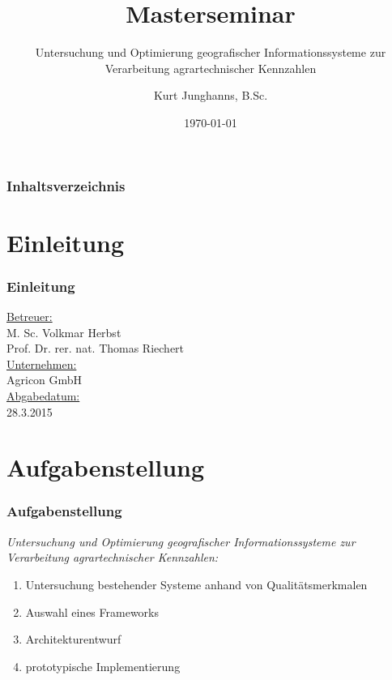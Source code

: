 \documentclass{beamer}
\begin{document}
\title{Masterseminar}
\subtitle{Untersuchung und Optimierung geografischer Informationssysteme zur Verarbeitung agrartechnischer Kennzahlen} 
\author{Kurt Junghanns, B.Sc.} 
\date{\today}

\begin{frame}
\titlepage
\end{frame}

\begin{frame}
\frametitle{Inhaltsverzeichnis}\tableofcontents
\end{frame}

\section{Einleitung}
\begin{frame}\frametitle{Einleitung}
\underline{Betreuer:}\\
M. Sc. Volkmar Herbst\\
Prof. Dr. rer. nat. Thomas Riechert\\
\vspace{\baselineskip}
\underline{Unternehmen:}\\
Agricon GmbH\\
\vspace{\baselineskip}
\underline{Abgabedatum:}\\
28.3.2015
\end{frame}

\section{Aufgabenstellung}
\begin{frame}\frametitle{Aufgabenstellung}
\textit{Untersuchung und Optimierung geografischer Informationssysteme zur Verarbeitung agrartechnischer Kennzahlen:}\\

\begin{enumerate}
\item Untersuchung bestehender Systeme anhand von Qualitätsmerkmalen
\item Auswahl eines Frameworks
\item Architekturentwurf
\item prototypische Implementierung %
\end{enumerate}
\end{frame}
\end{document}
